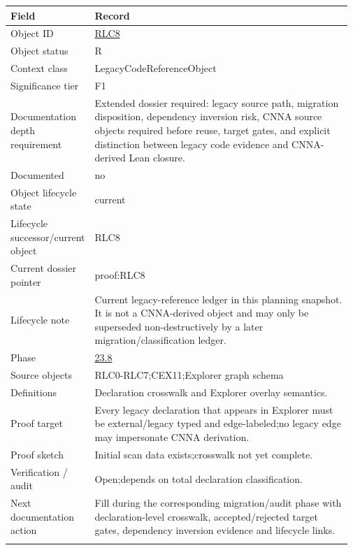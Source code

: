 \begin{longtable}{L{0.16\linewidth} L{0.81\linewidth}}
\hline
\textbf{Field} & \textbf{Record}\\
\hline
Object ID & \hyperlink{object-row-RLC8}{RLC8}\\
\hline\addlinespace[0.20em]
Object status & R\\
\hline\addlinespace[0.20em]
Context class & LegacyCodeReferenceObject\\
\hline\addlinespace[0.20em]
Significance tier & F1\\
\hline\addlinespace[0.20em]
Documentation depth requirement & Extended dossier required: legacy source path, migration disposition, dependency inversion risk, CNNA source objects required before reuse, target gates, and explicit distinction between legacy code evidence and CNNA-derived Lean closure.\\
\hline\addlinespace[0.20em]
Documented & no\\
\hline\addlinespace[0.20em]
Object lifecycle state & current\\
\hline\addlinespace[0.20em]
Lifecycle successor/\allowbreak{}current object & RLC8\\
\hline\addlinespace[0.20em]
Current dossier pointer & proof:RLC8\\
\hline\addlinespace[0.20em]
Lifecycle note & Current legacy-reference ledger in this planning snapshot. It is not a CNNA-derived object and may only be superseded non-destructively by a later migration/\allowbreak{}classification ledger.\\
\hline\addlinespace[0.20em]
Phase & \hyperlink{phase-row-23-8}{23.8}\\
\hline\addlinespace[0.20em]
Source objects & RLC0-RLC7;\newline CEX11;\newline Explorer graph schema\\
\hline\addlinespace[0.20em]
Definitions & Declaration crosswalk and Explorer overlay semantics.\\
\hline\addlinespace[0.20em]
Proof target & Every legacy declaration that appears in Explorer must be external/\allowbreak{}legacy typed and edge-labeled;\newline no legacy edge may impersonate CNNA derivation.\\
\hline\addlinespace[0.20em]
Proof sketch & Initial scan data exists;\newline crosswalk not yet complete.\\
\hline\addlinespace[0.20em]
Verification /\allowbreak{} audit & Open;\newline depends on total declaration classification.\\
\hline\addlinespace[0.20em]
Next documentation action & Fill during the corresponding migration/\allowbreak{}audit phase with declaration-level crosswalk, accepted/\allowbreak{}rejected target gates, dependency inversion evidence and lifecycle links.\\
\hline\addlinespace[0.20em]
\end{longtable}
\normalsize
